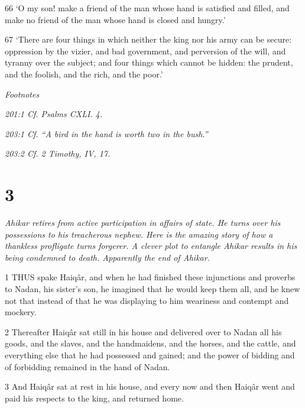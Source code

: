 \par 66 ‘O my son! make a friend of the man whose hand is satisfied and filled, and make no friend of the man whose hand is closed and hungry.’

\par 67 ‘There are four things in which neither the king nor his army can be secure: oppression by the vizier, and bad government, and perversion of the will, and tyranny over the subject; and four things which cannot be hidden: the prudent, and the foolish, and the rich, and the poor.’

\par \textit{Footnotes}

\par \textit{201:1 Cf. Psalms CXLI. 4.}

\par \textit{203:1 Cf. “A bird in the hand is worth two in the bush.”}

\par \textit{203:2 Cf. 2 Timothy, IV, 17.}

\chapter{3}

\par \textit{Ahikar retires from active participation in affairs of state. He turns over his possessions to his treacherous nephew. Here is the amazing story of how a thankless profligate turns forgerer. A clever plot to entangle Ahikar results in his being condemned to death. Apparently the end of Ahikar.}

\par 1 THUS spake Haiqâr, and when he had finished these injunctions and proverbs to Nadan, his sister's son, he imagined that he would keep them all, and he knew not that instead of that he was displaying to him weariness and contempt and mockery.

\par 2 Thereafter Haiqâr sat still in his house and delivered over to Nadan all his goods, and the slaves, and the handmaidens, and the horses, and the cattle, and everything else that he had possessed and gained; and the power of bidding and of forbidding remained in the hand of Nadan.

\par 3 And Haiqâr sat at rest in his house, and every now and then Haiqâr went and paid his respects to the king, and returned home.

